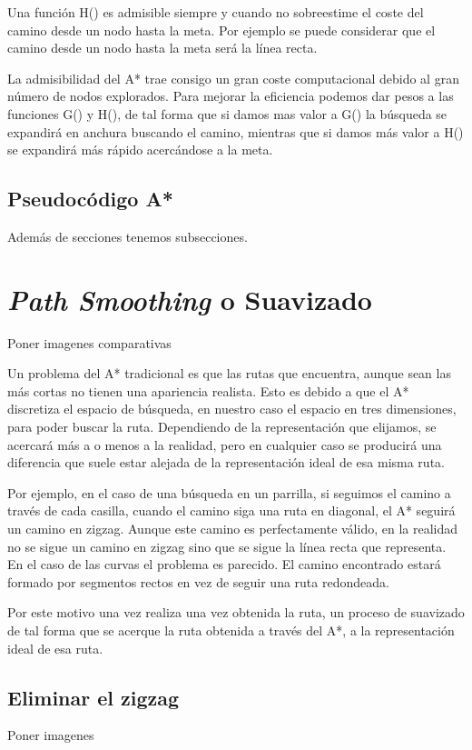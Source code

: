 Una función H() es admisible siempre y cuando no sobreestime el coste del camino desde un nodo hasta la meta. Por ejemplo se puede considerar que el camino desde un nodo hasta la meta será la línea recta.

La admisibilidad del A* trae consigo un gran coste computacional debido al gran número de nodos explorados. Para mejorar la eficiencia podemos dar pesos a las funciones G() y H(), de tal forma que si damos mas valor a G() la búsqueda se expandirá en anchura buscando el camino, mientras que si damos más valor a H() se expandirá más rápido acercándose a la meta.

\subsection{Pseudocódigo A*}

Además de secciones tenemos subsecciones.

\section{\textit{Path Smoothing} o Suavizado}
Poner imagenes comparativas

Un problema del A* tradicional es que las rutas que encuentra, aunque sean las más cortas no tienen una apariencia realista. Esto es debido a que el A* discretiza el espacio de búsqueda, en nuestro caso el espacio en tres dimensiones, para poder buscar la ruta. Dependiendo de la representación que elijamos, se acercará más a o menos a la realidad, pero en cualquier caso se producirá una diferencia que suele estar alejada de la representación ideal de esa misma ruta.

Por ejemplo, en el caso de una búsqueda en un parrilla, si seguimos el camino a través de cada casilla, cuando el camino siga una ruta en diagonal, el A* seguirá un camino en zigzag. Aunque este camino es perfectamente válido, en la realidad no se sigue un camino en zigzag sino que se sigue la línea recta que representa. En el caso de las curvas el problema es parecido. El camino encontrado estará formado por segmentos rectos en vez de seguir una ruta redondeada.

Por este motivo una vez realiza una vez obtenida la ruta, un proceso de suavizado de tal forma que se acerque la ruta obtenida a través del A*, a la representación ideal de esa ruta.

\subsection{Eliminar el zigzag}
Poner imagenes


